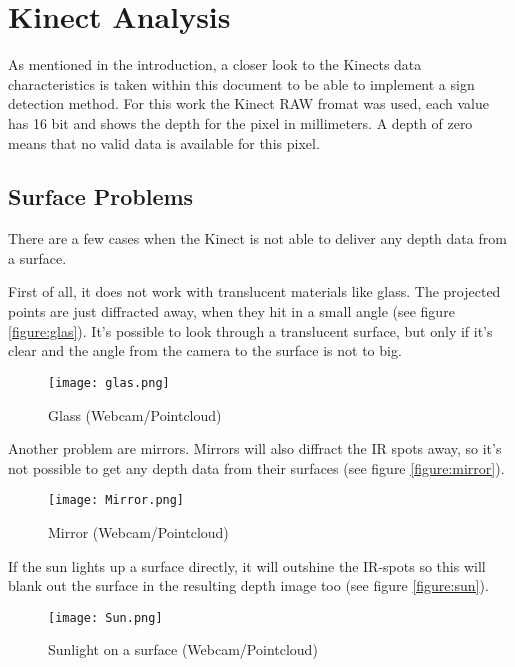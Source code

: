 \chapter{Kinect Analysis}
\graphicspath{{./KinectData/img/}}

As mentioned in the introduction, a closer look to the Kinects data characteristics is taken
within this document to be able to implement a sign detection method. 
For this work the Kinect RAW fromat was used, each value has 16 bit and shows the
depth for the pixel in millimeters. A depth of zero means that no valid data is available for
this pixel.

\section{Surface Problems}
There are a few cases when the Kinect is not able to deliver any depth data from a surface.

First of all, it does not work with translucent materials like glass. The projected
points are just diffracted away, when they hit in a small angle (see figure \vref{figure:glas}). 
It's possible to look through a translucent surface, but only if it's clear and the angle from the 
camera to the surface is not to big.
\begin{figure}[htp]
\begin{center}
  \texttt{[image: glas.png]} 
  \caption{Glass (Webcam/Pointcloud)}
  \label{figure:glas}
\end{center}
\end{figure}
 
Another problem are mirrors. Mirrors will also diffract the IR spots away, 
so it's not possible to get any depth data from their surfaces (see figure \vref{figure:mirror}).
\begin{figure}[htp]
\begin{center}
  \texttt{[image: Mirror.png]}
  \caption{Mirror (Webcam/Pointcloud)}
  \label{figure:mirror}
\end{center}
\end{figure}

If the sun lights up a surface directly, it will outshine the IR-spots so this will blank out the surface
in the resulting depth image too (see figure \vref{figure:sun}).
\begin{figure}[htp]
\begin{center}
  \texttt{[image: Sun.png]}
  \caption{Sunlight on a surface (Webcam/Pointcloud)}
  \label{figure:sun}
\end{center}
\end{figure}

